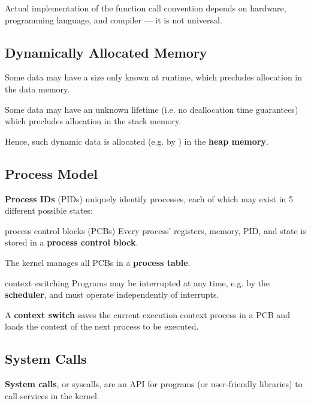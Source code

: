 Actual implementation of the function call convention depends on hardware, programming language, and compiler --- it is not universal.

\subsection{Dynamically Allocated Memory}
Some data may have a size only known at runtime, which precludes allocation in the data memory.

Some data may have an unknown lifetime (i.e. no deallocation time guarantees) which precludes allocation in the stack memory.

Hence, such dynamic data is allocated (e.g. by ) in the \textbf{heap memory}.

\subsection{Process Model}
\textbf{Process IDs} (PIDs) uniquely identify processes, each of which may exist in 5 different possible states:

\begin{enumerate}
\end{enumerate}

\begin{defn}{process control blocks (PCBs)}
    Every process' registers, memory, PID, and state is stored in a \textbf{process control block}.
    
    The kernel manages all PCBs in a \textbf{process table}.
\end{defn}

\begin{defn}{context switching}
    Programs may be interrupted at any time, e.g. by the \textbf{scheduler},
    and must operate independently of interrupts.
    
    A \textbf{context switch} saves the current execution context process in a PCB and loads the context of the next process to be executed.
\end{defn}

\subsection{System Calls}
\textbf{System calls}, or syscalls, are an API for programs (or user-friendly libraries) to call services in the kernel.


